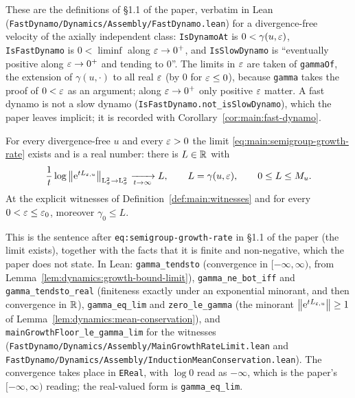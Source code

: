 These are the definitions of §1.1 of the paper, verbatim in Lean
(\texttt{FastDynamo/Dynamics/Assembly/FastDynamo.lean}) for a divergence-free velocity of
the axially independent class: \texttt{IsDynamoAt} is $0<\gamma(u,\varepsilon)$, \texttt{IsFastDynamo}
is $0<\liminf$ along $\varepsilon\to0^+$, and \texttt{IsSlowDynamo} is ``eventually positive along
$\varepsilon\to0^+$ and tending to $0$''.  The limits in $\varepsilon$ are taken of \texttt{gammaOf}, the
extension of $\gamma(u,\cdot)$ to all real $\varepsilon$ (by $0$ for $\varepsilon\leq0$), because
\texttt{gamma} takes the proof of $0<\varepsilon$ as an argument; along $\varepsilon\to0^+$ only positive
$\varepsilon$ matter.  A fast dynamo is not a slow dynamo (\texttt{IsFastDynamo.not\_isSlowDynamo}),
which the paper leaves implicit; it is recorded with
Corollary~\ref{cor:main:fast-dynamo}.

\begin{lemma}
  \label{lem:main:growth-rate-limit}
  \leanok
  For every divergence-free $u$ and every $\varepsilon>0$ the limit
  \eqref{eq:main:semigroup-growth-rate} exists and is a real number: there is $L\in\mathbb{R}$ with
  \[
    \frac1t\log\left\|\mathrm{e}^{tL_{\varepsilon,u}}\right\|_{\mathrm{L}^2_\sigma\to\mathrm{L}^2_\sigma}
    \xrightarrow[t\to\infty]{}L,
    \qquad
    L=\gamma(u,\varepsilon),
    \qquad
    0\leq L\leq M_u .
  \]
  At the explicit witnesses of Definition~\ref{def:main:witnesses} and for every
  $0<\varepsilon\leq\varepsilon_0$, moreover $\gamma_0\leq L$.
\end{lemma}

This is the sentence after \texttt{eq:semigroup-growth-rate} in §1.1 of the paper (the limit
exists), together with the facts that it is finite and non-negative, which the paper does not
state.  In Lean: \texttt{gamma\_tendsto} (convergence in $[-\infty,\infty)$, from
Lemma~\ref{lem:dynamics:growth-bound-limit}), \texttt{gamma\_ne\_bot\_iff} and
\texttt{gamma\_tendsto\_real} (finiteness exactly under an exponential minorant, and then
convergence in $\mathbb{R}$), \texttt{gamma\_eq\_lim} and \texttt{zero\_le\_gamma} (the minorant
$\left\|\mathrm{e}^{tL_{\varepsilon,u}}\right\|\geq1$ of Lemma~\ref{lem:dynamics:mean-conservation}), and
\texttt{mainGrowthFloor\_le\_gamma\_lim} for the witnesses
(\texttt{FastDynamo/Dynamics/Assembly/MainGrowthRateLimit.lean} and
\texttt{FastDynamo/Dynamics/Assembly/InductionMeanConservation.lean}).  The convergence takes
place in \texttt{EReal}, with $\log0$ read as $-\infty$, which is the paper's $[-\infty,\infty)$
reading; the real-valued form is \texttt{gamma\_eq\_lim}.

